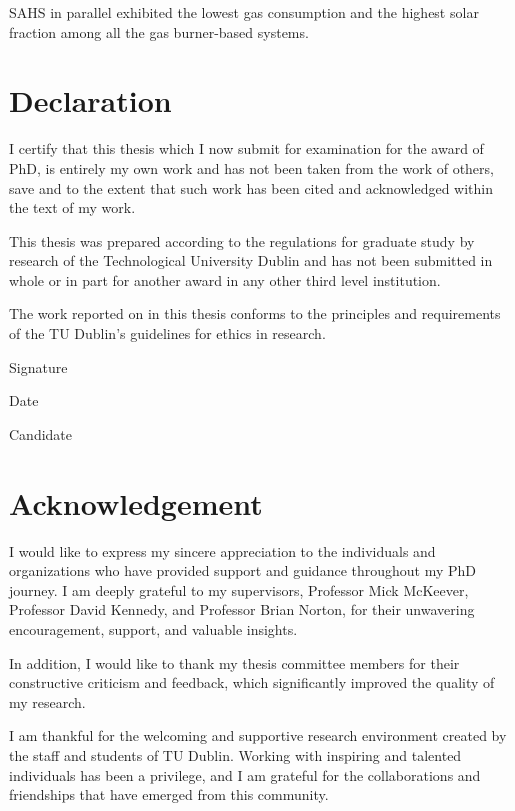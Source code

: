 SAHS in parallel exhibited the lowest gas consumption and the highest solar fraction among all the gas burner-based systems.


\chapter*{Declaration}
\vspace*{1cm}

I certify that this thesis which I now submit for examination for the award of PhD, is entirely my own work and has not been taken from the work of others, save and to the extent that such work has been cited and acknowledged within the text of my work.

This thesis was prepared according to the regulations for graduate study by research of the Technological University Dublin and has not been submitted in whole or in part for another award in any other third level institution.

The work reported on in this thesis conforms to the principles and requirements of the TU Dublin's guidelines for ethics in research.


Signature

Date

Candidate

\chapter*{Acknowledgement}
\vspace*{1cm}

I would like to express my sincere appreciation to the individuals and organizations who have provided support and guidance throughout my PhD journey. I am deeply grateful to my supervisors, Professor Mick McKeever, Professor David Kennedy, and Professor Brian Norton, for their unwavering encouragement, support, and valuable insights.

In addition, I would like to thank my thesis committee members for their constructive criticism and feedback, which significantly improved the quality of my research.

I am thankful for the welcoming and supportive research environment created by the staff and students of TU Dublin. Working with inspiring and talented individuals has been a privilege, and I am grateful for the collaborations and friendships that have emerged from this community.

